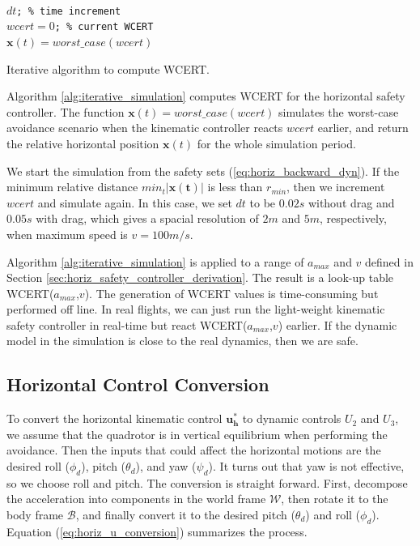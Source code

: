 \documentclass[journal,11pt,onecolumn,draftclsnofoot,]{IEEEtran}
\begin{document}
\begin{algorithm}
	\texttt{\\
		$dt$;	\hspace{3.2cm}\% time increment \\
		$wcert = 0$;	\hspace{2cm}\% current WCERT \\
		$ \boldsymbol{x}(t) = worst\_case(wcert) $\;
	}
	\caption{Iterative algorithm to compute WCERT.}
	\label{alg:iterative_simulation}
\end{algorithm}

Algorithm \ref{alg:iterative_simulation} computes WCERT for the horizontal safety controller. The function $ \boldsymbol{x}(t) = worst\_case(wcert) $ simulates the worst-case avoidance scenario when the kinematic controller reacts $wcert$ earlier, and return the relative horizontal position $\boldsymbol{x}(t)$ for the whole simulation period. 

We start the simulation from the safety sets (\ref{eq:horiz_backward_dyn}). If the minimum relative distance $ min_t|\boldsymbol{x(t)}|$ is less than $r_{min}$, then we increment $wcert$ and simulate again. In this case, we set $dt$ to be $0.02s$ without drag and $0.05s$ with drag, which gives a spacial resolution of $2 m$ and $5m$, respectively, when maximum speed is $v=100m/s$. 

Algorithm \ref{alg:iterative_simulation} is applied to a range of $a_{max}$ and $v$ defined in Section \ref{sec:horiz_safety_controller_derivation}. The result is a look-up table WCERT($a_{max}$,$v$). The generation of WCERT values is time-consuming but performed off line. In real flights, we can just run the light-weight kinematic safety controller in real-time but react WCERT($a_{max}$,$v$) earlier. If the dynamic model in the simulation is close to the real dynamics, then we are safe.

\subsection{Horizontal Control Conversion}
To convert the horizontal kinematic control $\boldsymbol{u_h^*}$ to dynamic controls $U_2$ and $U_3$, we assume that the quadrotor is in vertical equilibrium when performing the avoidance. Then the inputs that could affect the horizontal motions are the desired roll ($\phi_d$), pitch ($\theta_d$), and yaw ($\psi_d$). It turns out that yaw is not effective, so we choose roll and pitch. The conversion is straight forward. First, decompose the acceleration into components in the world frame $\mathcal{W}$, then rotate it to the body frame $\mathcal{B}$, and finally convert it to the desired pitch ($\theta_d$) and roll ($\phi_d$). Equation (\ref{eq:horiz_u_conversion}) summarizes the process. 
\end{document}
